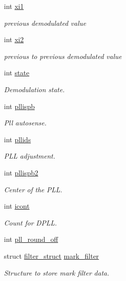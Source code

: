 \begin{DoxyCompactItemize}
int \hyperlink{structfsk__data_a3d199152a35ba387fa7b6ead6150c699}{xi1}
\begin{DoxyCompactList}\small\item\em previous demodulated value \end{DoxyCompactList}\item 
int \hyperlink{structfsk__data_a48bb683bd9e72b874c4050ae245fbc89}{xi2}
\begin{DoxyCompactList}\small\item\em previous to previous demodulated value \end{DoxyCompactList}\item 
int \hyperlink{structfsk__data_a9c20aa777c4cc352227a1251cb226e14}{state}
\begin{DoxyCompactList}\small\item\em Demodulation state. \end{DoxyCompactList}\item 
int \hyperlink{structfsk__data_ae12b4a66a5ad3c75bf39681fb9d6e77d}{pllispb}
\begin{DoxyCompactList}\small\item\em Pll autosense. \end{DoxyCompactList}\item 
int \hyperlink{structfsk__data_ac5ff3d61665d426edf3fcc34254239b6}{pllids}
\begin{DoxyCompactList}\small\item\em P\+L\+L adjustment. \end{DoxyCompactList}\item 
int \hyperlink{structfsk__data_aef22fc3fb9ea600a31e9ce03124568ae}{pllispb2}
\begin{DoxyCompactList}\small\item\em Center of the P\+L\+L. \end{DoxyCompactList}\item 
int \hyperlink{structfsk__data_a072af15b1e767960389e117cbc4dfee9}{icont}
\begin{DoxyCompactList}\small\item\em Count for D\+P\+L\+L. \end{DoxyCompactList}\item 
int \hyperlink{structfsk__data_a1c1e27f259f858b132ab2e2f0c329770}{pll\+\_\+round\+\_\+off}
\item 
struct \hyperlink{structfilter__struct}{filter\+\_\+struct} \hyperlink{structfsk__data_a78dccf8a4139f58535535117265ef49c}{mark\+\_\+filter}
\begin{DoxyCompactList}\small\item\em Structure to store mark filter data. \end{DoxyCompactList}\item 

\end{DoxyCompactItemize}
